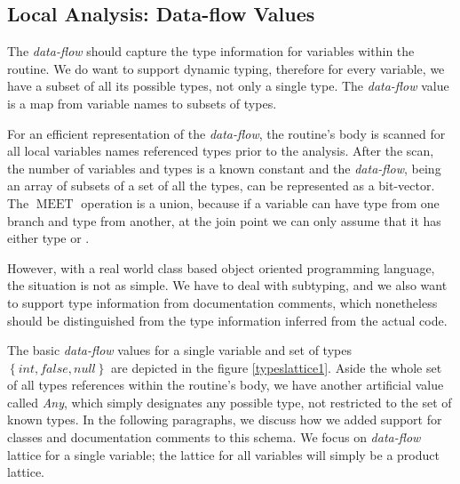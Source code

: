         \subsection{Local Analysis: Data-flow Values}
        
        The \emph{data-flow} should capture the type information 
        for variables within the routine. We do want to support 
        dynamic typing, therefore for every variable, we have 
        a subset of all its possible types, not only a single type.        
        The \emph{data-flow} value is a map from variable names to 
        subsets of types. 
        
        For an efficient representation of the \emph{data-flow}, 
        the routine's body is scanned for all local variables names 
        referenced types prior to the analysis. After the scan, the 
        number of variables and types is a known constant and the 
        \emph{data-flow}, being an array of subsets of a set 
        of all the types, can be represented as a bit-vector. 
        The $\operatorname{MEET}$ operation is a union, because if 
        a variable can have type  from one branch and 
        type  from another, at the join point we can only 
        assume that it has either type  or .
        
        However, with a real world class based object oriented 
        programming language, the situation is not as simple. 
        We have to deal with subtyping, and we also want to 
        support type information from documentation comments, 
        which nonetheless should be distinguished from the 
        type information inferred from the actual code.
        
        The basic \emph{data-flow} values for a single variable 
        and set of types $\left\{int, false, null\right\}$ are depicted 
        in the figure \ref{typeslattice1}. Aside the whole set of 
        all types references within the routine's body, we have 
        another artificial value called \emph{Any}, which simply 
        designates any possible type, not restricted to the set 
        of known types. In the following paragraphs, we discuss 
        how we added support for classes and documentation 
        comments to this schema. We focus on \emph{data-flow} 
        lattice for a single variable; the lattice for all variables 
        will simply be a product lattice.
        
